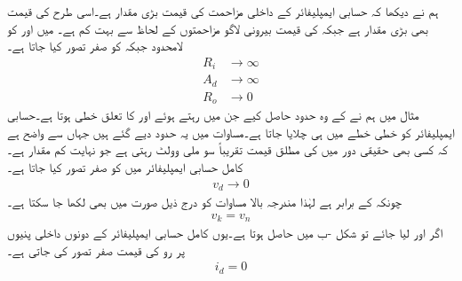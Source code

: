 ہم نے دیکھا کہ حسابی ایمپلیفائر کے داخلی مزاحمت  کی قیمت بڑی مقدار ہے۔اسی طرح  کی قیمت بھی بڑی مقدار ہے جبکہ  کی قیمت بیرونی لاگو مزاحمتوں کے لحاظ  سے بہت کم ہے۔ میں  اور  کو لامحدود جبکہ  کو صفر  تصور کیا جاتا ہے۔
\begin{align}
R_i& \to \infty \label{مساوات_حسابی_کامل_شرط_الف}\\
A_d& \to \infty  \label{مساوات_حسابی_کامل_شرط_ب}\\
R_o& \to 0  \label{مساوات_حسابی_کامل_شرط_پ}
\end{align}
مثال  میں ہم نے  کے وہ حدود حاصل کیے جن میں رہتے ہوئے  اور  کا تعلق خطی ہوتا ہے۔حسابی ایمپلیفائر کو خطی خطے میں ہی چلایا جاتا ہے۔مساوات  میں یہ حدود دیے گئے ہیں جہاں سے واضح ہے کہ کسی بھی حقیقی دور میں   کی مطلق قیمت تقریباً سو ملی وولٹ رہتی ہے جو نہایت کم مقدار ہے۔کامل حسابی ایمپلیفائر میں  کو صفر تصور کیا جاتا ہے۔
\begin{align}\label{مساوات_حسابی_کامل_شرط_ت}
v_d \to 0  
\end{align}
چونکہ  کے برابر ہے لہٰذا مندرجہ بالا مساوات کو درج ذیل صورت میں بھی لکھا جا سکتا ہے۔
\begin{align}\label{مساوات_حسابی_کامل_شرط_ٹ}
v_k=v_n
\end{align}
اگر  اور {} لیا جائے تو شکل -ب میں  حاصل ہوتا ہے۔یوں کامل حسابی ایمپلیفائر کے دونوں داخلی پنیوں پر رو کی قیمت صفر تصور کی جاتی ہے۔
\begin{align}\label{مساوات_حسابی_کامل_شرط_ث}
i_d=0
\end{align}

